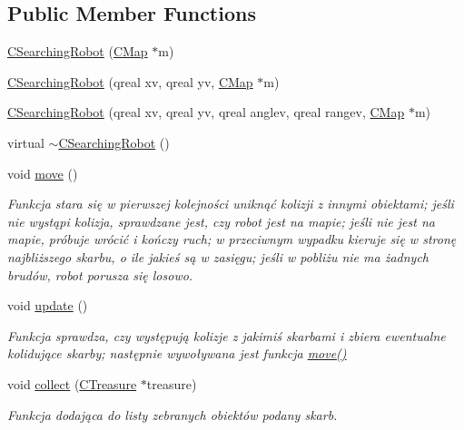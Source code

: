 \subsection*{Public Member Functions}
\begin{DoxyCompactItemize}
\item 
\mbox{\hyperlink{class_c_searching_robot_a94c25b4cc475f118b8d6521b169a3b09}{C\+Searching\+Robot}} (\mbox{\hyperlink{class_c_map}{C\+Map}} $\ast$m)
\item 
\mbox{\hyperlink{class_c_searching_robot_a4b9874d7d35fabecc7953bf31ab18fc1}{C\+Searching\+Robot}} (qreal xv, qreal yv, \mbox{\hyperlink{class_c_map}{C\+Map}} $\ast$m)
\item 
\mbox{\hyperlink{class_c_searching_robot_a89fb6d088efb21dfa85395c587f0e12d}{C\+Searching\+Robot}} (qreal xv, qreal yv, qreal anglev, qreal rangev, \mbox{\hyperlink{class_c_map}{C\+Map}} $\ast$m)
\item 
virtual \mbox{\hyperlink{class_c_searching_robot_aaa18ea94f4bd833465f9801faef6bd75}{$\sim$\+C\+Searching\+Robot}} ()
\item 
void \mbox{\hyperlink{class_c_searching_robot_a2c2150e7fd1cefbb5851e039cd76572f}{move}} ()
\begin{DoxyCompactList}\small\item\em Funkcja stara się w pierwszej kolejności uniknąć kolizji z innymi obiektami; jeśli nie wystąpi kolizja, sprawdzane jest, czy robot jest na mapie; jeśli nie jest na mapie, próbuje wrócić i kończy ruch; w przeciwnym wypadku kieruje się w stronę najbliższego skarbu, o ile jakieś są w zasięgu; jeśli w pobliżu nie ma żadnych brudów, robot porusza się losowo. \end{DoxyCompactList}\item 
void \mbox{\hyperlink{class_c_searching_robot_a6e9cdc9eccd32a470d8953f1a3cccd46}{update}} ()
\begin{DoxyCompactList}\small\item\em Funkcja sprawdza, czy występują kolizje z jakimiś skarbami i zbiera ewentualne kolidujące skarby; następnie wywoływana jest funkcja \mbox{\hyperlink{class_c_searching_robot_a2c2150e7fd1cefbb5851e039cd76572f}{move()}} \end{DoxyCompactList}\item 
void \mbox{\hyperlink{class_c_searching_robot_a1f09a0003c1c7c309895745a2dbad885}{collect}} (\mbox{\hyperlink{class_c_treasure}{C\+Treasure}} $\ast$treasure)
\begin{DoxyCompactList}\small\item\em Funkcja dodająca do listy zebranych obiektów podany skarb. \end{DoxyCompactList}\end{DoxyCompactItemize}
